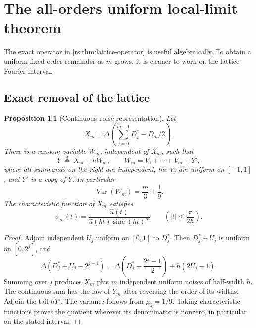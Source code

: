 \documentclass[11pt,a4paper,oneside,openany]{book}
\numberwithin{equation}{chapter}
\newtheorem{proposition}[theorem]{Proposition}
\theoremstyle{definition}
\theoremstyle{remark}
\DeclareMathOperator{\sinc}{sinc}
\begin{document}
\chapter{The all-orders uniform local-limit theorem}\label{rs:sec:local-limit}

The exact operator in \cref{rs:thm:lattice-operator} is useful
algebraically. To obtain a uniform fixed-order remainder as $m$ grows,
it is cleaner to work on the lattice Fourier interval.

\section{Exact removal of the lattice}

\begin{proposition}[Continuous noise representation]\label{rs:prop:dequantization}
Let
\begin{equation}
 X_m=\Delta\left(\sum_{j=0}^{m-1}D_j^*-D_m/2\right).
\end{equation}
There is a random variable $W_m$, independent of $X_m$, such that
\begin{equation}
 Y\ \overset{\mathrm d}=\ X_m+hW_m,
 \qquad W_m=V_1+\cdots+V_m+Y',
 \label{rs:eq:dequantization}
\end{equation}
where all summands on the right are independent, the $V_j$ are
uniform on $[-1,1]$, and $Y'$ is a copy of $Y$. In particular
\begin{equation}
 \operatorname{Var}(W_m)=\frac m3+\frac19.
 \label{rs:eq:noise-variance}
\end{equation}
The characteristic function of $X_m$ satisfies
\begin{equation}
 \psi_m(t)=\frac{\widehat u(t)}{\widehat u(ht)\sinc(ht)^m}
 \qquad\left(|t|\leq\frac{\pi}{2h}\right).
 \label{rs:eq:psi-quotient}
\end{equation}
\end{proposition}
\begin{proof}
Adjoin independent $U_j$ uniform on $[0,1]$ to $D_j^*$. Then
$D_j^*+U_j$ is uniform on $[0,2^j]$, and
\begin{equation}
 \Delta\left(D_j^*+U_j-2^{j-1}\right)
 =\Delta\left(D_j^*-\frac{2^j-1}{2}\right)+h(2U_j-1).
\end{equation}
Summing over $j$ produces $X_m$ plus $m$ independent uniform
noises of half-width $h$. The continuous sum has the law of $Y_m$
after reversing the order of its widths. Adjoin the tail $hY'$.
The variance follows from $\mu_2=1/9$. Taking characteristic
functions proves the quotient wherever its denominator is nonzero,
in particular on the stated interval.
\end{proof}
\end{document}
